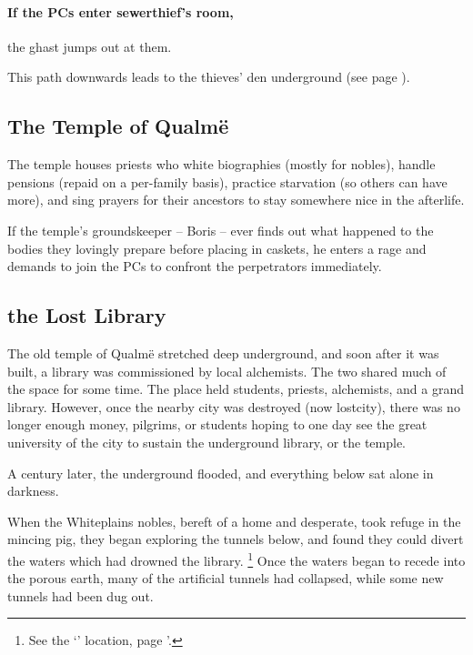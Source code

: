 \begin{multicols}{2}
\paragraph{If the PCs enter \gls{sewerthief}'s room,}
the ghast jumps out at them.

\ghast

\label{pigDown}
This path downwards leads to the thieves' den underground (see page \pageref{sewerPigWalk}).

\subsection{The Temple of Qualm\"e}

The temple houses priests who white biographies (mostly for nobles), handle pensions (repaid on a per-family basis), practice starvation (so others can have more), and sing prayers for their ancestors to stay somewhere nice in the afterlife.

If the temple's groundskeeper -- Boris -- ever finds out what happened to the bodies they lovingly prepare before placing in caskets, he enters a rage and demands to join the PCs to confront the perpetrators immediately.


\subsection{the Lost Library}\label{sewers}\setcounter{list}{0}

The old temple of Qualm\"{e} stretched deep underground, and soon after it was built, a library was commissioned by local alchemists.
The two shared much of the space for some time.
The place held students, priests, alchemists, and a grand library.
However, once the nearby city was destroyed (now \gls{lostcity}), there was no longer enough money, pilgrims, or students hoping to one day see the great university of the city to sustain the underground library, or the temple.

A century later, the underground flooded, and everything below sat alone in darkness.

When the Whiteplains nobles, bereft of a home and desperate, took refuge in the mincing pig, they began exploring the tunnels below, and found they could divert the waters which had drowned the library.%
\footnote{See the `' location, page \pageref{runoff}'.}
Once the waters began to recede into the porous earth, many of the artificial tunnels had collapsed, while some new tunnels had been dug out.


\end{multicols}
